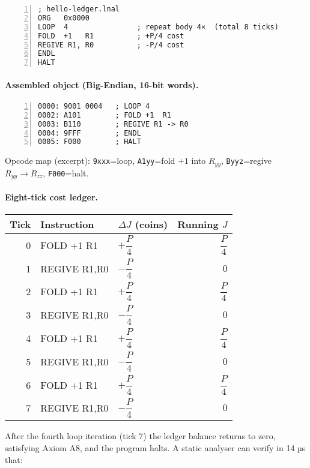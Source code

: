 \documentclass[11pt,oneside]{book}
\begin{document}
\begin{lstlisting}[language={},numbers=left]
; hello-ledger.lnal
ORG   0x0000
LOOP  4                ; repeat body 4×  (total 8 ticks)
FOLD  +1   R1          ; +P/4 cost
REGIVE R1, R0          ; -P/4 cost
ENDL
HALT
\end{lstlisting}

\paragraph*{Assembled object (Big-Endian, 16-bit words).}

\begin{lstlisting}[language={},numbers=left]
0000: 9001 0004   ; LOOP 4
0002: A101        ; FOLD +1  R1
0003: B110        ; REGIVE R1 -> R0
0004: 9FFF        ; ENDL
0005: F000        ; HALT
\end{lstlisting}

Opcode map (excerpt):  
\texttt{9xxx}=loop, \texttt{A1yy}=fold \(+\!1\) into \(R_{yy}\),  
\texttt{Byyz}=regive \(R_{yy}\!\to\!R_{zz}\), \texttt{F000}=halt.

\paragraph*{Eight-tick cost ledger.}

\begin{center}
\begin{tabular}{@{}rllr@{}}
\toprule
Tick & Instruction & $\Delta J$ (coins) & Running $J$ \\
\midrule
0 & FOLD +1 R1   & $+\dfrac{P}{4}$ & $\dfrac{P}{4}$ \\
1 & REGIVE R1,R0 & $-\dfrac{P}{4}$ & $0$ \\[2pt]
2 & FOLD +1 R1   & $+\dfrac{P}{4}$ & $\dfrac{P}{4}$ \\
3 & REGIVE R1,R0 & $-\dfrac{P}{4}$ & $0$ \\[2pt]
4 & FOLD +1 R1   & $+\dfrac{P}{4}$ & $\dfrac{P}{4}$ \\
5 & REGIVE R1,R0 & $-\dfrac{P}{4}$ & $0$ \\[2pt]
6 & FOLD +1 R1   & $+\dfrac{P}{4}$ & $\dfrac{P}{4}$ \\
7 & REGIVE R1,R0 & $-\dfrac{P}{4}$ & $0$ \\
\bottomrule
\end{tabular}
\end{center}

\noindent
After the fourth loop iteration (tick 7) the ledger balance returns to
zero, satisfying Axiom A8, and the program halts.  A static analyser can
verify in 14 µs that:
\end{document}
